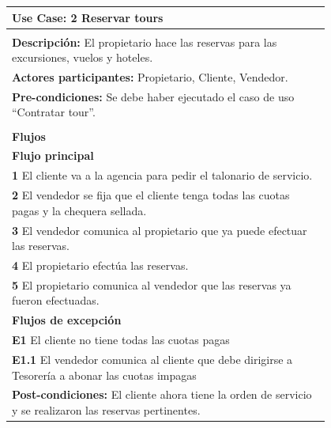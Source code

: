 \documentclass[12pt,a4paper,titlepage,oneside]{article}
\begin{document}
\begin{tabular}{| l | p{0.8\linewidth} |} \hline
	\multicolumn{2}{|p{0.8\linewidth}|}{\textbf{Use Case:} 2 Reservar tours} \\ \hline
	\multicolumn{2}{|c|}{} \\ \hline
	\multicolumn{2}{|p{0.8\linewidth}|}{\textbf{Descripci\'on:} El propietario hace las reservas para las excursiones, vuelos y hoteles.} \\ \hline
	\multicolumn{2}{|p{0.8\linewidth}|}{\textbf{Actores participantes:} Propietario, Cliente, Vendedor.} \\ \hline
	\multicolumn{2}{|p{0.8\linewidth}|}{\textbf{Pre-condiciones:} Se debe haber ejecutado el caso de uso “Contratar tour”.} \\ \hline
	\multicolumn{2}{|c|}{} \\ \hline
	\multicolumn{2}{|p{0.8\linewidth}|}{\textbf{Flujos}} \\ \hline
	\multicolumn{2}{|p{0.8\linewidth}|}{\textbf{Flujo principal}} \\ \hline
	\multicolumn{2}{|p{0.8\linewidth}|}{\textbf{1} El cliente va a la agencia para pedir el talonario de servicio.} \\ \hline
	\multicolumn{2}{|p{0.8\linewidth}|}{\textbf{2} El vendedor se fija que el cliente tenga todas las cuotas pagas y la chequera sellada.} \\ \hline
	\multicolumn{2}{|p{0.8\linewidth}|}{\textbf{3} El vendedor comunica al propietario que ya puede efectuar las reservas.} \\ \hline
		\multicolumn{2}{|p{0.8\linewidth}|}{\textbf{4} El propietario efectúa las reservas.} \\ \hline
		\multicolumn{2}{|p{0.8\linewidth}|}{\textbf{5} El propietario comunica al vendedor que las reservas ya fueron efectuadas.} \\ \hline
			\multicolumn{2}{|p{0.8\linewidth}|}{\textbf{Flujos de excepci\'on}} \\ \hline
	\multicolumn{2}{|p{0.8\linewidth}|}{\textbf{E1} El cliente no tiene todas las cuotas pagas} \\ \hline
	\multicolumn{2}{|p{0.8\linewidth}|}{\textbf{E1.1} El vendedor comunica al cliente que debe dirigirse a Tesorería a abonar las cuotas impagas} \\ \hline

	\multicolumn{2}{|p{0.8\linewidth}|}{\textbf{Post-condiciones:} El cliente ahora tiene la orden de servicio y se realizaron las reservas pertinentes.}\\ \hline
\end{tabular} \\\\
 \\\\
\end{document}
